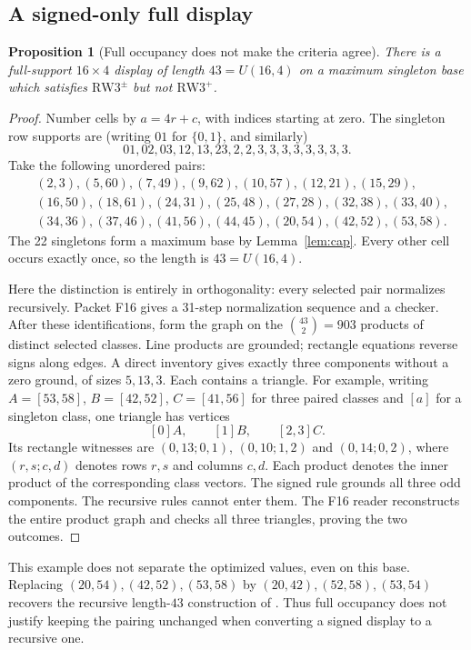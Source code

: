 \documentclass[11pt,a4paper]{article}
\newtheorem{proposition}[theorem]{Proposition}
\theoremstyle{definition}
\newcommand{\RW}{\mathrm{RW3}^{+}}
\newcommand{\SG}{\mathrm{RW3}^{\pm}}
\begin{document}
\subsection{A signed-only full display}
\begin{proposition}[Full occupancy does not make the criteria agree]
\label{prop:full-four-distinction}
There is a full-support $16\times4$ display of length $43=U(16,4)$
on a maximum singleton base which satisfies $\SG$ but not $\RW$.
\end{proposition}
\begin{proof}
Number cells by $a=4r+c$, with indices starting at zero. The singleton
row supports are (writing $01$ for $\{0,1\}$, and similarly)
\[
 01,02,03,12,13,23,2,2,3,3,3,3,3,3,3,3.
\]
Take the following unordered pairs:
\begin{align*}
 &(2,3),(5,60),(7,49),(9,62),(10,57),(12,21),(15,29),\\
 &(16,50),(18,61),(24,31),(25,48),(27,28),(32,38),(33,40),\\
 &(34,36),(37,46),(41,56),(44,45),(20,54),(42,52),(53,58).
\end{align*}
The 22 singletons form a maximum base by Lemma~\ref{lem:cap}.
Every other cell occurs exactly once, so the length is $43=U(16,4)$.

Here the distinction is entirely in orthogonality: every selected pair
normalizes recursively. Packet F16 gives a 31-step normalization
sequence and a checker. After these identifications, form the
graph on the $\binom{43}{2}=903$ products of distinct selected classes.
Line products are grounded; rectangle equations reverse signs along edges.
A direct inventory gives exactly three components without a zero ground,
of sizes $5,13,3$. Each contains a triangle. For example, writing
$A=[53,58]$, $B=[42,52]$, $C=[41,56]$ for three paired classes
and $[a]$ for a singleton class, one triangle has vertices
\[
 [0]A,\qquad [1]B,\qquad [2,3]C.
\]
Its rectangle witnesses are $(0,13;0,1)$, $(0,10;1,2)$ and
$(0,14;0,2)$, where $(r,s;c,d)$ denotes rows $r,s$ and columns $c,d$. Each product denotes the inner product of the corresponding
class vectors. The signed rule grounds all three odd components. The
recursive rules cannot enter them. The F16 reader reconstructs the entire
product graph and checks all three triangles, proving the two outcomes.
\end{proof}

This example does not separate the optimized values, even on this base.
Replacing $(20,54),(42,52),(53,58)$ by
$(20,42),(52,58),(53,54)$ recovers the recursive length-$43$
construction of \cite[Figure~2]{CC}. Thus full occupancy does not justify keeping the pairing unchanged
when converting a signed display to a recursive one.
\end{document}

